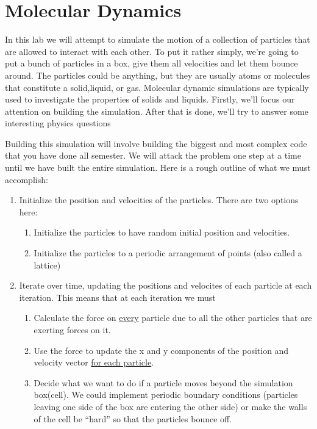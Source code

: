 \chapter{Molecular Dynamics}
\label{Lab:21}

In this lab we will attempt to simulate the motion of a collection of
particles that are allowed to interact with each other.  To put it
rather simply, we're going to put a bunch of particles in a box, give
them all velocities and let them bounce around.  The particles
could be anything, but they are usually atoms or molecules that
constitute a solid,liquid, or gas.  Molecular dynamic simulations are
typically used to investigate the properties of solids and liquids.
Firstly, we'll focus our attention on building the simulation.  After
that is done, we'll try to answer some interesting physics questions

Building this simulation will involve building the biggest and most
complex code that you have done all semester. We will attack the
problem one step at a time until we have built the entire simulation.
Here is a rough outline of what we must accomplish:

\begin{enumerate}
\item Initialize the position and velocities of the particles.  There
  are two options here:
\begin{enumerate}
\item Initialize the particles to have random initial
  position and velocities.
\item Initialize the particles to a periodic arrangement of points
  (also called a lattice)
\end{enumerate}
\item Iterate over time, updating the positions and velocites of each
  particle at each iteration.  This means that at each iteration we must
\begin{enumerate}
\item Calculate the force on \ul{every} particle due to all the other
  particles that are exerting forces on it.
\item Use the force to update the x and y components of the position
  and velocity vector \ul{for each particle}.
\item Decide what we want to do if a particle moves beyond the
  simulation box(cell).  We could implement periodic boundary
  conditions (particles leaving one side of the box are entering the other
  side) or make the walls of the cell be ``hard'' so that the
  particles bounce off.
\end{enumerate}
\end{enumerate}

